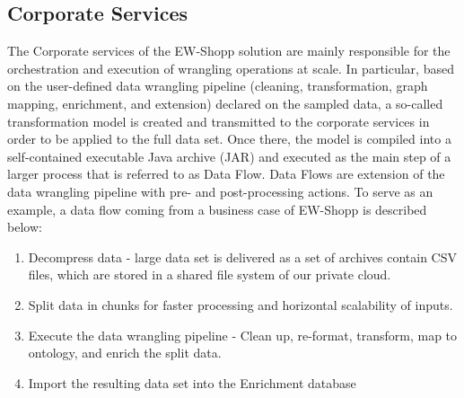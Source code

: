 \subsection{Corporate Services}\label{sec:bdr}



The Corporate services of the EW-Shopp solution are mainly responsible for the orchestration and execution of wrangling operations at scale. 
In particular, based on the user-defined data wrangling pipeline (cleaning, transformation, graph mapping, enrichment, and extension) declared on the sampled data, a so-called transformation model is created and transmitted to the corporate services in order to be applied to the full data set. Once there, the model is compiled into a self-contained executable Java archive (JAR) and executed as the main step of a larger process that is referred to as Data Flow.  
Data Flows are  extension of the data wrangling pipeline with pre- and post-processing actions. 
To serve as an example, a data flow coming from a business case of EW-Shopp is described below:
\begin{enumerate}
    \item Decompress data - large data set is delivered as a set of archives contain CSV files, which are stored in a shared file system of our private cloud.
    \item Split data in chunks for faster processing and horizontal scalability of inputs.
    \item Execute the data wrangling pipeline - Clean up, re-format, transform, map to ontology, and enrich the split data. 
    \item Import the resulting data set into the Enrichment database
\end{enumerate}



